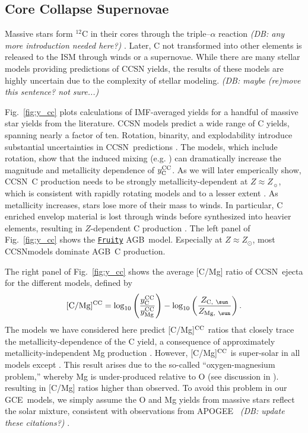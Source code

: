 \documentclass[fleqn,
usenatbib]{mnras}
\makeatletter
\newcommand{\fruity}{\texttt{\hyperlink{fruity}{Fruity}}}
\newcommand{\agb}{AGB}
\newcommand{\apogee}{APOGEE}
\newcommand{\cc}{CCSN}
\newcommand{\gce}{GCE}
\newcommand{\Ycc}{{y_{\rm C}^{\rm CC}}}
\newcommand{\Yoc}{{y_{\rm Mg}^{\rm CC}}}
\newcommand{\Zo}{ Z_{\sun}}
\DeclareRobustCommand\citepos
  {\begingroup
   \let\NAT@nmfmt\NAT@posfmt%
   \NAT@swafalse\let\NAT@ctype\z@\NAT@partrue
   \@ifstar{\NAT@fulltrue\NAT@citetp}{\NAT@fullfalse\NAT@citetp}}
\let\NAT@orig@nmfmt\NAT@nmfmt
\def\NAT@posfmt#1{\NAT@orig@nmfmt{#1's}}
\newcommand{\dbnote}[1]{ {\color{Thistle} \textit{\small (DB: #1)}} }
\makeatother
\begin{document}
\subsection{Core Collapse Supernovae}


Massive stars form $^{12}$C in their cores through the triple--$\alpha$ reaction \dbnote{any more introduction needed here?}. Later, C not transformed into other elements is released to the ISM through winds or a supernovae.
While there are many stellar models providing predictions of \cc{} yields, the results of these models are highly uncertain due to the complexity of stellar modeling. \dbnote{maybe (re)move this sentence? not sure...}

Fig.~\ref{fig:y_cc} plots calculations of IMF-averaged yields for a handful of massive star yields from the literature.
\cc{} models predict a wide range of C yields, spanning nearly a factor of ten. 
Rotation, binarity, and explodability introduce substantial uncertainties in \cc\ predictions \citep{farmer+21}. The \cite{LC18} models, which include rotation, show that the induced mixing (e.g. \citealt{frischknecht+16}) can dramatically increase the magnitude and metallicity dependence of $\Ycc$. As we will later emperically show, \cc\ C production needs to be strongly metallicity-dependent at $Z \approx \Zo$, which is consistent with \citepos{LC18} rapidly rotating models and to a lesser extent \citet{NKT13}.
As metallicity increases, stars lose more of their mass to winds. In particular, C enriched envelop material is lost through winds before synthesized into heavier elements, resulting in $Z$-dependent C production \citep{LC18}.
The left panel of Fig.~\ref{fig:y_cc} shows the \fruity{} \agb\ model. Especially at $Z\approx Z_\odot$, most \cc models dominate \agb\ C production. 


The right panel of Fig.~\ref{fig:y_cc} shows the average [C/Mg] ratio of \cc\ ejecta for the different models, defined by
\begin{equation}\label{eq:c_mg_cc}
    {\rm [C/Mg]^{CC}} = \log_{10}\left( \frac{\Ycc}{\Yoc}\right) - \log_{10} \left( \frac{Z_{{\rm C},\ \sun }}{Z_{{\rm Mg},\ \sun }} \right).
\end{equation}
The models we have considered here predict [C/Mg]$^{\rm CC}$ ratios that closely trace the metallicity-dependence of the C yield, a consequence of approximately
metallicity-independent Mg production \citep[e.g][]{andrews+17}.
However, [C/Mg]$^{\rm CC}$ is super-solar in all models except
\citet{NKT13}.
This result arises due to the so-called ``oxygen-magnesium problem,'' whereby Mg
is under-produced relative to O (see discussion in \citealt{emily+21}).
resulting in [C/Mg] ratios higher than observed.
To avoid this problem in our \gce\ models, we simply assume the O and Mg yields
from massive stars reflect the solar mixture, consistent with observations from \apogee\ \citep{weinberg+19, weinberg+22} \dbnote{update these citations?}.
\end{document}
